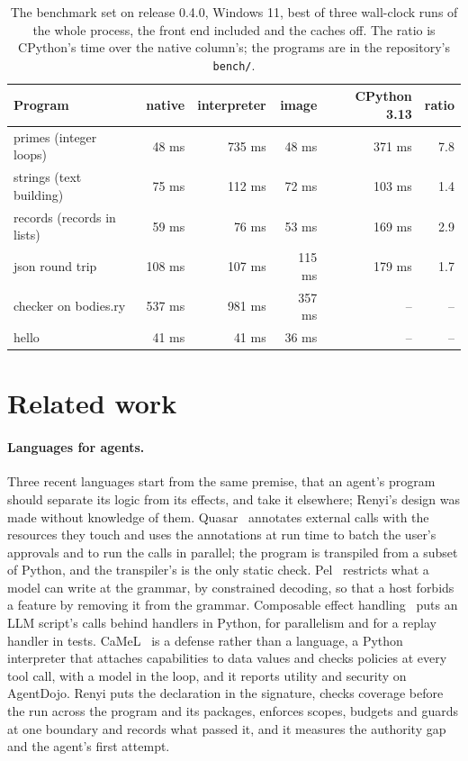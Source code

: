 \documentclass[11pt]{article}
\begin{document}
\begin{table}[t]
\centering
\begin{tabular}{lrrrrr}
\toprule
Program & native & interpreter & image & CPython 3.13 & ratio \\
\midrule
primes (integer loops) & 48 ms & 735 ms & 48 ms & 371 ms & 7.8 \\
strings (text building) & 75 ms & 112 ms & 72 ms & 103 ms & 1.4 \\
records (records in lists) & 59 ms & 76 ms & 53 ms & 169 ms & 2.9 \\
json round trip & 108 ms & 107 ms & 115 ms & 179 ms & 1.7 \\
checker on bodies.ry & 537 ms & 981 ms & 357 ms & -- & -- \\
hello & 41 ms & 41 ms & 36 ms & -- & -- \\
\bottomrule
\end{tabular}
\caption{The benchmark set on release 0.4.0, Windows 11, best of three
wall-clock runs of the whole process, the front end included and the
caches off. The ratio is CPython's time over the native column's; the
programs are in the repository's \texttt{bench/}.}
\label{tab:bench}
\end{table}

\section{Related work}
\label{sec:related}

\paragraph{Languages for agents.} Three recent languages start from the
same premise, that an agent's program should separate its logic from
its effects, and take it elsewhere; Renyi's design was made without
knowledge of them. Quasar~\citep{mell2025quasar} annotates external
calls with the resources they touch and uses the annotations at run
time to batch the user's approvals and to run the calls in parallel;
the program is transpiled from a subset of Python, and the transpiler's
is the only static check. Pel~\citep{mohammadi2025pel} restricts what a
model can write at the grammar, by constrained decoding, so that a host
forbids a feature by removing it from the grammar. Composable effect
handling~\citep{wang2025effect} puts an LLM script's calls behind
handlers in Python, for parallelism and for a replay handler in tests.
CaMeL~\citep{debenedetti2025camel} is a defense rather than a language,
a Python interpreter that attaches capabilities to data values and
checks policies at every tool call, with a model in the loop, and it
reports utility and security on AgentDojo. Renyi puts the declaration
in the signature, checks coverage before the run across the program and
its packages, enforces scopes, budgets and guards at one boundary and
records what passed it, and it measures the authority gap and the
agent's first attempt.
\end{document}
